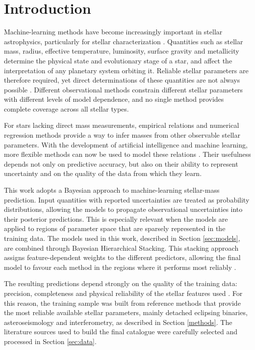 \begingroup
{\tableofcontents}
\endgroup
\newpage


\section{Introduction} \label{sec:introduction}

Machine-learning methods have become increasingly important in stellar astrophysics, particularly for stellar characterization \citep{moya2022}. Quantities such as stellar mass, radius, effective temperature, luminosity, surface gravity and metallicity determine the physical state and evolutionary stage of a star, and affect the interpretation of any planetary system orbiting it. Reliable stellar parameters are therefore required, yet direct determinations of these quantities are not always possible \citep{Serenelli2021}. Different observational methods constrain different stellar parameters with different levels of model dependence, and no single method provides complete coverage across all stellar types.

For stars lacking direct mass measurements, empirical relations and numerical regression methods provide a way to infer masses from other observable stellar parameters. With the development of artificial intelligence and machine learning, more flexible methods can now be used to model these relations \citep{moya2022}. Their usefulness depends not only on predictive accuracy, but also on their ability to represent uncertainty and on the quality of the data from which they learn.

This work adopts a Bayesian approach to machine-learning stellar-mass prediction. Input quantities with reported uncertainties are treated as probability distributions, allowing the models to propagate observational uncertainties into their posterior predictions. This is especially relevant when the models are applied to regions of parameter space that are sparsely represented in the training data. The models used in this work, described in Section \ref{sec:models}, are combined through Bayesian Hierarchical Stacking. This stacking approach assigns feature-dependent weights to the different predictors, allowing the final model to favour each method in the regions where it performs most reliably \citep{yao2022hierarchicalstacking}.

The resulting predictions depend strongly on the quality of the training data: precision, completeness and physical reliability of the stellar features used \citep{Serenelli2021}. For this reason, the training sample was built from reference methods that provide the most reliable available stellar parameters, mainly detached eclipsing binaries, asteroseismology and interferometry, as described in Section \ref{methods}. The literature sources used to build the final catalogue were carefully selected and processed in Section \ref{sec:data}.

